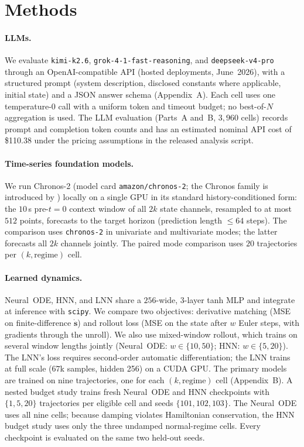 \documentclass{article}
\begin{document}
\section{Methods}
\label{sec:methods}
\paragraph{LLMs.} We evaluate \texttt{kimi-k2.6}, \texttt{grok-4-1-fast-reasoning}, and
\texttt{deepseek-v4-pro} through an OpenAI-compatible API (hosted deployments, June~2026),
with a structured prompt (system description, disclosed constants where applicable, initial
state) and a JSON answer schema (Appendix~A). Each cell uses one temperature-$0$ call with a
uniform token and timeout budget; no best-of-$N$ aggregation is used. The LLM evaluation (Parts~A and~B, $3{,}960$ cells) records prompt and completion
token counts and has an estimated nominal API cost of \$110.38 under the pricing assumptions
in the released analysis script.

\paragraph{Time-series foundation models.} We run Chronos-2 (model card \texttt{amazon/chronos-2};
the Chronos family is introduced by \citealp{ansari2024chronos}) locally
on a single GPU in its standard history-conditioned form: the $10$\,s pre-$t{=}0$ context
window of all $2k$ state channels, resampled to at most $512$ points, forecasts to the target
horizon (prediction length $\le 64$ steps). The comparison uses \texttt{chronos-2} in
univariate and multivariate modes; the latter forecasts all $2k$ channels jointly. The
paired mode comparison uses $20$ trajectories per $(k,\mathrm{regime})$ cell.

\paragraph{Learned dynamics.} Neural~ODE, HNN, and LNN share a $256$-wide, $3$-layer tanh
MLP and integrate at inference with \texttt{scipy}. We compare two objectives: derivative
matching (MSE on finite-difference $\dot{\mathbf{s}}$) and rollout loss (MSE on the state
after $w$ Euler steps, with gradients through the unroll). We also use mixed-window rollout,
which trains on several window lengths jointly (Neural~ODE: $w\in\{10,50\}$; HNN:
$w\in\{5,20\}$). The LNN's loss requires second-order automatic differentiation; the LNN trains at
full scale ($67$k samples, hidden 256) on a CUDA GPU.
The primary models are trained on nine trajectories, one for each $(k,\mathrm{regime})$ cell
(Appendix~B). A nested budget study trains fresh Neural~ODE and HNN checkpoints with
$\{1,5,20\}$ trajectories per eligible cell and seeds $\{101,102,103\}$. The Neural~ODE
uses all nine cells; because damping violates Hamiltonian conservation, the HNN budget study
uses only the three undamped normal-regime cells. Every checkpoint is evaluated on the same
two held-out seeds.
\end{document}
